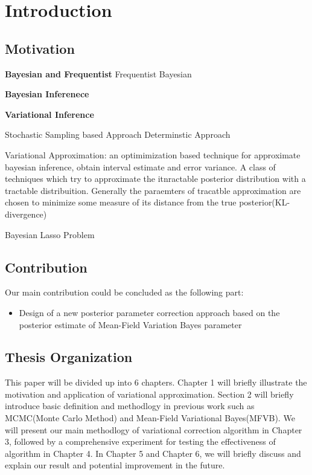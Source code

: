 \chapter{Introduction}
\label{Chapter1}
\section{Motivation}

\textbf{Bayesian and Frequentist}
Frequentist
Bayesian

\textbf{Bayesian Inferenece}

\textbf{Variational Inference}

Stochastic Sampling based Approach
Determinstic Approach



Variational Approximation: an optimimization based technique for approximate bayesian inference, obtain interval estimate and error variance.
A class of techniques which try to approximate the itnractable posterior distribution with a tractable distribuition. Generally the paraemters of tracatble approximation are chosen to minimize some measure of its distance from the true posterior(KL-divergence)


Bayesian Lasso Problem





\section{Contribution}
Our main contribution could be concluded as the following part:
\begin{itemize}
	\item Design of a new posterior parameter correction approach based on the posterior estimate of Mean-Field Variation Bayes parameter 
\end{itemize}



\section{Thesis Organization}
This paper will be divided up into 6 chapters. Chapter 1 will briefly illustrate the motivation and application of variational approximation. Section 2 will briefly introduce basic definition and methodlogy in previous work such as MCMC(Monte Carlo Method) and Mean-Field Variational Bayes(MFVB). We will present our main methodlogy of variational correction algorithm in Chapter 3, followed by a comprehensive experiment for testing the effectiveness of algorithm in Chapter 4. In Chapter 5 and Chapter 6, we will briefly discuss and explain our result and potential improvement in the future. 



 